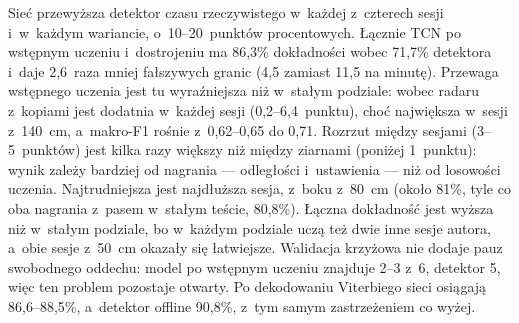 \documentclass[12pt,a4paper,oneside]{report}
\begin{document}
\begin{table}[H]
\centering
\small
\caption{Walidacja krzyżowa po sesjach autora, TCN w~czasie rzeczywistym: cztery sesje
testowe razem, średnia z~trzech ziaren, oraz dokładność osobno dla każdej sesji (w~nawiasie
liczba okien). Kolumny $\pm$: odchylenie standardowe dokładności między ziarnami i~między
sesjami. Wszystkie 6~pauz swobodnego oddechu leży w~dwóch pierwszych sesjach.}
\label{tab:sieci-walidacja-krzyzowa}
\setlength{\tabcolsep}{4pt}
\end{table}

Sieć przewyższa detektor czasu rzeczywistego w~każdej z~czterech sesji i~w~każdym wariancie,
o~10--20~punktów procentowych. Łącznie TCN po wstępnym uczeniu i~dostrojeniu ma 86,3\%
dokładności wobec 71,7\% detektora i~daje 2,6~raza mniej fałszywych granic (4,5 zamiast 11,5
na minutę). Przewaga wstępnego uczenia jest tu wyraźniejsza niż w~stałym podziale: wobec
radaru z~kopiami jest dodatnia w~każdej sesji (0,2--6,4~punktu), choć największa w~sesji
z~\SI{140}{cm}, a~makro-F1 rośnie z~0,62--0,65 do 0,71. Rozrzut między sesjami (3--5~punktów)
jest kilka razy większy niż między ziarnami (poniżej 1~punktu): wynik zależy bardziej od
nagrania --- odległości i~ustawienia --- niż od losowości uczenia. Najtrudniejsza jest
najdłuższa sesja, z~boku z~\SI{80}{cm} (około 81\%, tyle co oba nagrania z~pasem w~stałym
teście, 80,8\%). Łączna dokładność jest wyższa niż w~stałym podziale, bo w~każdym podziale
uczą też dwie inne sesje autora, a~obie sesje z~\SI{50}{cm} okazały się łatwiejsze.
Walidacja krzyżowa nie dodaje pauz swobodnego oddechu: model po wstępnym uczeniu znajduje 2--3
z~6, detektor 5, więc ten problem pozostaje otwarty. Po dekodowaniu Viterbiego sieci osiągają
86,6--88,5\%, a~detektor offline 90,8\%, z~tym samym zastrzeżeniem co wyżej.
\end{document}
